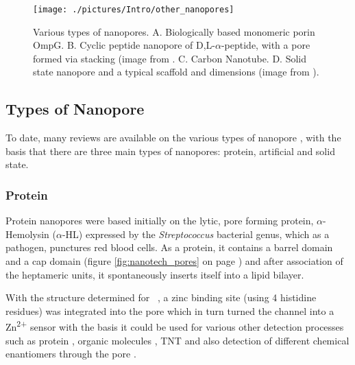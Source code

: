 \begin{figure}[H]
\begin{center}
\texttt{[image: ./pictures/Intro/other\_nanopores]}
\caption[Various types of nanopores] {Various types of nanopores. A. Biologically based monomeric porin OmpG. B. Cyclic peptide nanopore of  D,L-$\alpha$-peptide, with a pore formed via stacking (image from \cite{Lopez2001}. C. Carbon Nanotube. D. Solid state nanopore  and a typical scaffold and dimensions (image from \cite{Janssen2012}).}
\label{fig:other_nanopores}
\end{center}
\end{figure}

\subsection{Types of Nanopore}

To date, many reviews are available on the various types of nanopore \cite{Howorka2009,Hou2011,Kowalczyk2011,Stoloff2013}, with the basis that there are three main types of nanopores: protein, artificial and solid state. 

\subsubsection{Protein}


Protein nanopores were based initially on the lytic, pore forming protein, $\alpha$-Hemolysin ($\alpha$-HL) expressed by the \textit{Streptococcus} bacterial genus, which as a pathogen, punctures red blood cells. As a protein, it contains a barrel domain and a cap domain (figure \ref{fig:nanotech_pores} on page \pageref{fig:nanotech_pores}) and after association of the heptameric units, it spontaneously inserts itself into a lipid bilayer.

With the structure determined for \ahl\ \cite{Song1996}, a zinc binding site (using 4 histidine residues) was integrated into the pore which in turn turned the channel into a Zn\textsuperscript{2+} sensor \cite{Kasianowicz1999,Braha1997a} with the basis it could be used for various other detection  processes \cite{Bayley2001} such as protein \cite{Mov2000}, organic molecules \cite{Gu1999}, TNT \cite{Guan2005} and also detection of different chemical enantiomers through the pore \cite{Kang2006}. 

